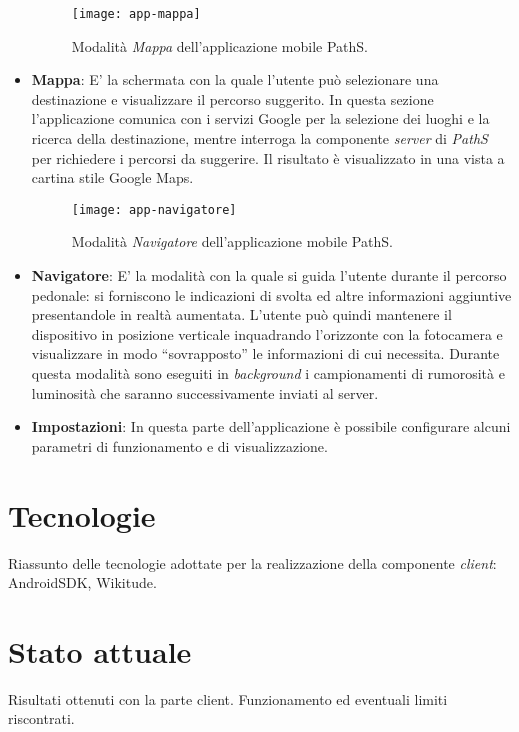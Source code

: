 \begin{itemize}

\begin{figure}[h]
  \centering
  \texttt{[image: app-mappa]}
  \caption{\footnotesize{Modalità \emph{Mappa} dell'applicazione mobile PathS.}}
  \label{fig:app-mappa}
\end{figure}

\item \textbf{Mappa}: E' la schermata con la quale l'utente può selezionare una destinazione e visualizzare il percorso suggerito. In questa sezione l'applicazione comunica con i servizi Google per la selezione dei luoghi e la ricerca della destinazione, mentre interroga la componente \emph{server} di \emph{PathS} per richiedere i percorsi da suggerire. Il risultato è visualizzato in una vista a cartina stile Google Maps.

\begin{figure}[h]
  \centering
  \texttt{[image: app-navigatore]}
  \caption{\footnotesize{Modalità \emph{Navigatore} dell'applicazione mobile PathS.}}
  \label{fig:app-navigatore}
\end{figure}

\item \textbf{Navigatore}: E' la modalità con la quale si guida l'utente durante il percorso pedonale: si forniscono le indicazioni di svolta ed altre informazioni aggiuntive presentandole in realtà aumentata. L'utente può quindi mantenere il dispositivo in posizione verticale inquadrando l'orizzonte con la fotocamera e visualizzare in modo ``sovrapposto'' le informazioni di cui necessita. Durante questa modalità sono eseguiti in \emph{background} i campionamenti di rumorosità e luminosità che saranno successivamente inviati al server.
\item \textbf{Impostazioni}: In questa parte dell'applicazione è possibile configurare alcuni parametri di funzionamento e di visualizzazione.
\end{itemize} 

\section{Tecnologie}
Riassunto delle tecnologie adottate per la realizzazione della componente \emph{client}: AndroidSDK, Wikitude.

\section{Stato attuale}
Risultati ottenuti con la parte client. Funzionamento ed eventuali limiti riscontrati.
